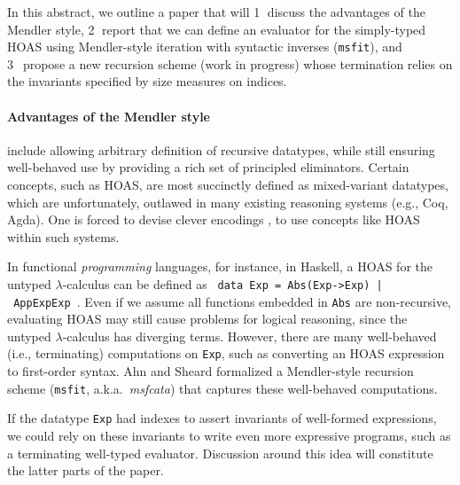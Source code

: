 \documentclass[a4paper]{easychair} %
\newcommand{\eg}[0]{{e.g.}}
\newcommand{\ie}[0]{{i.e.}}
\newcommand{\aka}[0]{{a.k.a.}}
\newcommand{\msfit}[0]{\texttt{msfit}}
\begin{document}
In this abstract, we outline a paper
that will
\textcircled{1} discuss the advantages of the Mendler style,
\textcircled{2} report that we can define an evaluator for the simply-typed HOAS
using Mendler-style iteration with syntactic inverses (\msfit), and
\textcircled{3}~propose a new recursion scheme (work in progress) whose
termination relies on the invariants specified by size measures on indices.
\vspace*{-2ex}
\paragraph{Advantages of the Mendler style\!\!\!}
include allowing arbitrary definition of recursive datatypes, while still 
ensuring well-behaved use by providing a rich set of principled eliminators.
Certain concepts, such as HOAS, are most succinctly defined as
mixed-variant datatypes, which are unfortunately, outlawed in
many existing reasoning systems (\eg, Coq, Agda).
One is forced to devise clever encodings \cite{PHOAS},
to use concepts like HOAS within such systems.

In functional \emph{programming} languages, for instance, in Haskell,
a HOAS for the untyped $\lambda$-calculus can be defined as
{\small\texttt{\,data Exp~=~Abs\;(Exp\;->\;Exp)~|~App\;Exp\;Exp\,}}.
Even if we assume all functions embedded in \texttt{Abs} are non-recursive,
evaluating HOAS may still cause problems for logical reasoning,
since the untyped $\lambda$-calculus has diverging terms. However, there are
many well-behaved (\ie, terminating) computations on \texttt{Exp}, such as
converting an HOAS expression to first-order syntax.
Ahn and Sheard \cite{AhnShe11} formalized a Mendler-style recursion scheme
(\msfit, \aka\ \textit{msfcata}) that captures these well-behaved computations.

If the datatype \texttt{Exp} had indexes to assert invariants of
well-formed expressions, we could rely on these invariants to write
even more expressive programs, such as a terminating well-typed evaluator.
Discussion around this idea will constitute the latter parts of the paper.
\vspace*{-2ex}
\end{document}
